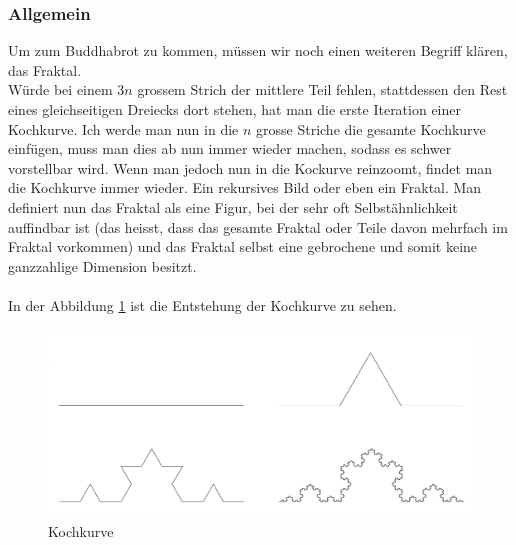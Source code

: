 \subsubsection{Allgemein}
Um zum Buddhabrot zu kommen, müssen wir noch einen weiteren Begriff klären, das Fraktal.\\ Würde bei einem 3$n$ grossem Strich der mittlere Teil fehlen, stattdessen den Rest eines gleichseitigen Dreiecks dort stehen, hat man die erste Iteration einer Kochkurve. Ich werde man nun in die $n$ grosse Striche die gesamte Kochkurve einfügen, muss man dies ab nun immer wieder machen, sodass es schwer vorstellbar wird. Wenn man jedoch nun in die Kockurve reinzoomt, findet man die Kochkurve immer wieder. Ein rekursives Bild oder eben ein Fraktal. Man definiert nun das Fraktal als eine Figur, bei der sehr oft Selbstähnlichkeit auffindbar ist (das heisst, dass das gesamte Fraktal oder Teile davon mehrfach im Fraktal vorkommen) und das Fraktal selbst eine gebrochene und somit keine ganzzahlige Dimension besitzt.\\
\\
In der Abbildung \ref{fig:Kochkurve} ist die Entstehung der Kochkurve zu sehen.

\begin{figure}[h]
    \centering
    \includegraphics[width=.5\textwidth]{Pictures/Kochkurve.png}
    \caption{Kochkurve}
    \label{fig:Kochkurve}
\end{figure}

